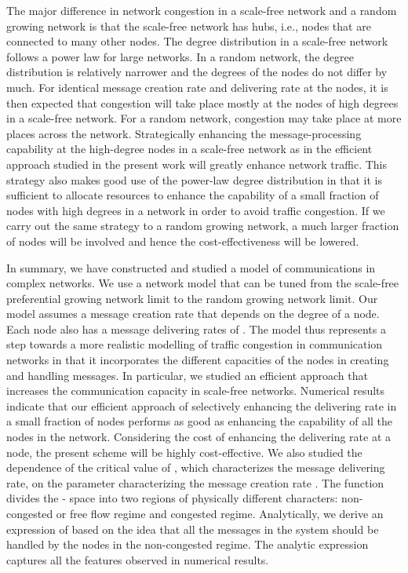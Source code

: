\documentclass[aps,prl,twocolumn,superscriptaddress,showpacs]{revtex4}
\begin{document}
The major difference in network congestion in a scale-free network
and a random growing network is that the scale-free network has
hubs, i.e., nodes that are connected to many other nodes.  The
degree distribution in a scale-free network follows a power law
for large networks.  In a random network, the degree distribution
is relatively narrower and the degrees of the nodes do not differ
by much.  For identical message creation rate and delivering rate
at the nodes, it is then expected that congestion will take place
mostly at the nodes of high degrees in a scale-free network.  For
a random network, congestion may take place at more places across
the network.  Strategically enhancing the message-processing
capability at the high-degree nodes in a scale-free network as in
the efficient approach studied in the present work will greatly
enhance network traffic.  This strategy also makes good use of the
power-law degree distribution in that it is sufficient to allocate
resources to enhance the capability of a small fraction of nodes
with high degrees in a network in order to avoid traffic
congestion.  If we carry out the same strategy to a random growing
network, a much larger fraction of nodes will be involved and
hence the cost-effectiveness will be lowered.

In summary, we have constructed and studied a model of
communications in complex networks.  We use a network model that
can be tuned from the scale-free preferential growing network
limit to the random growing network limit.  Our model assumes a
message creation rate  that depends on the degree of
a node.  Each node also has a message delivering rates of . The model thus represents a step towards a more realistic
modelling of traffic congestion in communication networks in that
it incorporates the different capacities of the nodes in creating
and handling messages. In particular, we studied an efficient
approach that increases the communication capacity in scale-free
networks.  Numerical results indicate that our efficient approach
of selectively enhancing the delivering rate in a small fraction
of nodes performs as good as enhancing the capability of all the
nodes in the network.  Considering the cost of enhancing the
delivering rate at a node, the present scheme will be highly
cost-effective.  We also studied the dependence of the critical
value of , which characterizes the message delivering rate,
on the parameter characterizing the message creation rate
.  The function  divides the
- space into two regions of physically different
characters: non-congested or free flow regime and congested
regime.  Analytically, we derive an expression of
 based on the idea that all the messages in
the system should be handled by the nodes in the non-congested
regime.  The analytic expression captures all the features
observed in numerical results.
\end{document}

